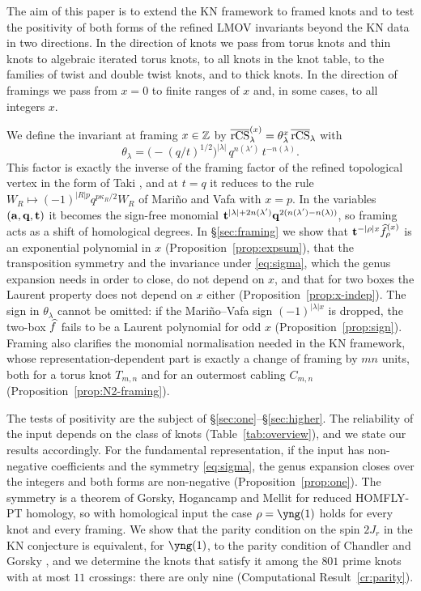 The aim of this paper is to extend the KN framework to framed knots and to test the positivity of both forms of the refined LMOV invariants
beyond the KN data in two directions.
In the direction of knots we pass from torus knots and thin knots to algebraic iterated torus knots, to all knots in the knot table, to the families of twist and double twist knots, and to thick knots.
In the direction of framings we pass from $x=0$ to finite ranges of $x$ and, in some cases, to all integers $x$.

We define the invariant at framing $x\in\mathbb{Z}$ by $\overline{\mathrm{rCS}}^{(x)}_\lambda=\theta_\lambda^x\,\overline{\mathrm{rCS}}_\lambda$ with
\[
\theta_\lambda=\bigl(-(q/t)^{1/2}\bigr)^{|\lambda|}\,q^{n(\lambda')}\,t^{-n(\lambda)} .
\]
This factor is exactly the inverse of the framing factor of the refined topological vertex in the form of Taki \cite{Taki07},
and at $t=q$ it reduces to the rule $W_R\mapsto(-1)^{|R|p}q^{p\kappa_R/2}W_R$ of Mari\~no and Vafa \cite{Marino01} with $x=p$.
In the variables $(\mathbf{a},\mathbf{q},\mathbf{t})$ it becomes the sign-free monomial $\mathbf{t}^{|\lambda|+2n(\lambda')}\mathbf{q}^{2(n(\lambda')-n(\lambda))}$, so framing acts as a shift of homological degrees.
In \S\ref{sec:framing} we show that $\mathbf{t}^{-|\rho|x}\widehat{f}^{(x)}_\rho$ is an exponential polynomial in $x$ (Proposition~\ref{prop:expsum}),
that the transposition symmetry and the invariance under \eqref{eq:sigma}, which the genus expansion needs in order to close, do not depend on $x$,
and that for two boxes the Laurent property does not depend on $x$ either (Proposition~\ref{prop:x-indep}).
The sign in $\theta_\lambda$ cannot be omitted: if the Mari\~no--Vafa sign $(-1)^{|\lambda|x}$ is dropped, the two-box $\widehat{f}$ fails to be a Laurent polynomial for odd $x$ (Proposition~\ref{prop:sign}).
Framing also clarifies the monomial normalisation needed in the KN framework, whose representation-dependent part is exactly a change of framing by $mn$ units, both for a torus knot $T_{m,n}$ and for an outermost cabling $C_{m,n}$ (Proposition~\ref{prop:N2-framing}).

The tests of positivity are the subject of \S\ref{sec:one}--\S\ref{sec:higher}.
The reliability of the input depends on the class of knots (Table~\ref{tab:overview}), and we state our results accordingly.
For the fundamental representation, if the input has non-negative coefficients and the symmetry \eqref{eq:sigma}, the genus expansion closes over the integers and both forms are non-negative (Proposition~\ref{prop:one}).
The symmetry is a theorem of Gorsky, Hogancamp and Mellit \cite{Gorsky21} for reduced HOMFLY-PT homology, so with homological input the case $\rho=\yng(1)$ holds for every knot and every framing.
We show that the parity condition on the spin $2J_r$ in the KN conjecture is equivalent,
for $\yng(1)$, to the parity condition of Chandler and Gorsky \cite{Chandler22}, and we determine the knots that satisfy it among the $801$ prime knots with at most $11$ crossings: there are only nine (Computational Result~\ref{cr:parity}).

